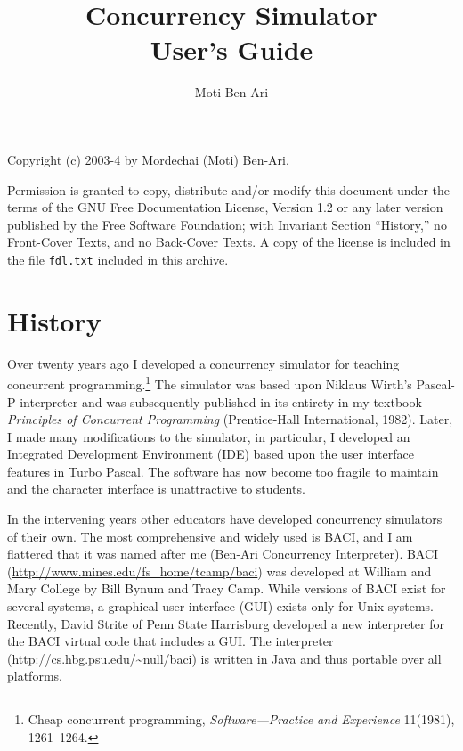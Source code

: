 \documentclass[11pt]{article}
\title{\jb{} Concurrency Simulator\\User's Guide}
\author{Moti Ben-Ari}
\newcommand{\baci}{\textsc{\sffamily BACI}}
\newcommand{\p}[1]{\texttt{#1}}
\begin{document}
\maketitle
\thispagestyle{empty}

\newpage
\thispagestyle{empty}
\vfil
\begin{center}
Copyright (c) 2003-4 by Mordechai (Moti) Ben-Ari.
\end{center}

Permission is granted to copy, distribute and/or modify this document
under the terms of the GNU Free Documentation License, Version 1.2
or any later version published by the Free Software Foundation;
with Invariant Section ``History,'' no Front-Cover Texts, and no Back-Cover Texts.
A copy of the license is included in the file \p{fdl.txt}
included in this archive.

\vfil
\newpage

\section{History}

Over twenty years ago I developed a concurrency simulator
for teaching concurrent programming.\footnote{Cheap concurrent programming,
\emph{Software---Practice and Experience} 11(1981), 1261--1264.}
The simulator was based upon Niklaus Wirth's Pascal-P interpreter
and was subsequently published in its entirety in my textbook
\emph{Principles of Concurrent Programming}
(Prentice-Hall International, 1982).
Later, I made many modifications to the simulator,
in particular, I developed an Integrated Development Environment (IDE)
based upon the user interface features in Turbo Pascal.
The software has now become too fragile to maintain
and the character interface is unattractive to students.

In the intervening years other educators have developed concurrency
simulators of their own.
The most comprehensive and widely used is \baci{},
and I am flattered that it was named after me (Ben-Ari
Concurrency Interpreter).
\baci{} (\url{http://www.mines.edu/fs_home/tcamp/baci})
was developed at William and Mary College by
Bill Bynum and Tracy Camp.
While versions of \baci{} exist for several systems,
a graphical user interface (GUI) exists only for Unix systems.
Recently, David Strite of Penn State Harrisburg
developed a new interpreter for the \baci{} virtual code that includes
a GUI. The interpreter (\url{http://cs.hbg.psu.edu/~null/baci})
is written in Java and thus portable over all platforms.
\end{document}

